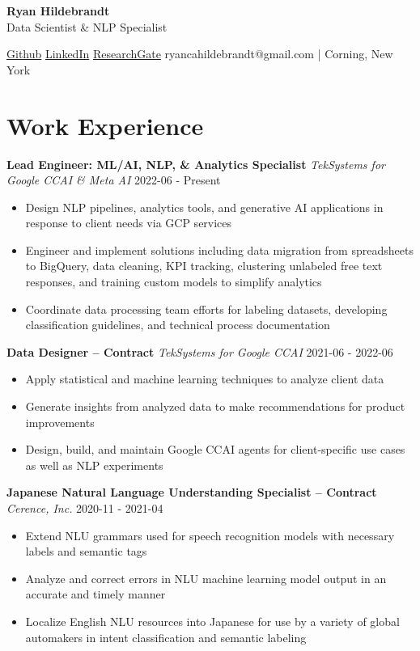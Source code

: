 \documentclass[a4paper,9pt]{extarticle}
\begin{document}
\begin{center}
\textbf{\Large Ryan Hildebrandt}\\[2pt]
Data Scientist \& NLP Specialist

\href{https://github.com/ryancahildebrandt}{Github} \href{https://linkedin.com/in/rcah}{LinkedIn} \href{https://researchgate.net/profile/Ryan-Hildebrandt}{ResearchGate}
ryancahildebrandt@gmail.com | Corning, New York
	\end{center}

\section*{Work Experience}

\noindent
\textbf{Lead Engineer: ML/AI, NLP, \& Analytics Specialist}
\noindent
\textit{TekSystems for Google CCAI \& Meta AI} \hfill 2022-06 - Present
\begin{itemize}
\item Design NLP pipelines, analytics tools, and generative AI applications in response to client needs via GCP services
\item Engineer and implement solutions including data migration from spreadsheets to BigQuery, data cleaning, KPI tracking, clustering unlabeled free text responses, and training custom models to simplify analytics
\item Coordinate data processing team efforts for labeling datasets, developing classification guidelines, and technical process documentation
\end{itemize}

\noindent
\textbf{Data Designer -- Contract}
\noindent
\textit{TekSystems for Google CCAI} \hfill 2021-06 - 2022-06
\begin{itemize}
\item Apply statistical and machine learning techniques to analyze client data
\item Generate insights from analyzed data to make recommendations for product improvements
\item Design, build, and maintain Google CCAI agents for client-specific use cases as well as NLP experiments
\end{itemize}

\noindent
\textbf{Japanese Natural Language Understanding Specialist -- Contract}
\noindent
\textit{Cerence, Inc.} \hfill 2020-11 - 2021-04
\begin{itemize}
\item Extend NLU grammars used for speech recognition models with necessary labels and semantic tags
\item Analyze and correct errors in NLU machine learning model output in an accurate and timely manner
\item Localize English NLU resources into Japanese for use by a variety of global automakers in intent classification and semantic labeling
\end{itemize}
\end{document}
